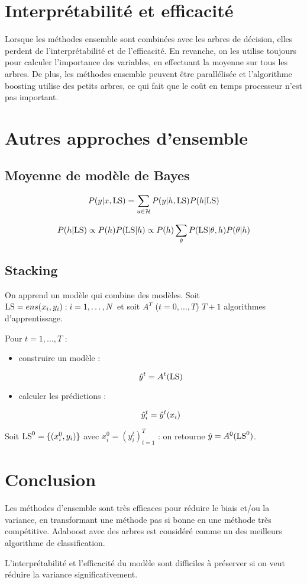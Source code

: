 \section{Interprétabilité et efficacité}
	
Lorsque les méthodes ensemble sont combinées avec les arbres de décision, elles perdent de l'interprétabilité et de l'efficacité. En revanche, on les utilise toujours pour calculer l'importance des variables, en effectuant la moyenne sur tous les arbres. De plus, les méthodes ensemble peuvent être parallélisée et l'algorithme boosting utilise des petits arbres, ce qui fait que le coût en temps processeur n'est pas important.
		
	
\section{Autres approches d'ensemble}

	\subsection{Moyenne de modèle de Bayes}
	$$P(y \vert x, \text{LS}) = \sum_{u \in \mathcal{H}} P(y \vert h, \text{LS}) P(h \vert \text{LS})$$
	
	$$P(h \vert \text{LS}) \propto P(h) P(\text{LS} \vert h) \propto P(h) \sum_\theta P(\text{LS} \vert \theta, h) P(\theta \vert h)$$
	
	\subsection{Stacking}
	
	On apprend un modèle qui combine des modèles. Soit $\text{LS} = ens{(x_i, y_i) : i = 1, \dots , N}$ et soit $A^T$ ($t = 0, \dots , T$) $T + 1$ algorithmes d'apprentissage.
	
	Pour $t = 1, \dots , T$ :
	
	\begin{itemize}
		\item construire un modèle :
		
		$$\hat{y}^t = A^t(\text{LS})$$
		
		\item calculer les prédictions :
		
		$$\hat{y}_i^t = \hat{y}^t (x_i)$$
	\end{itemize}
	
	Soit $\text{LS}^0 = \lbrace (x_i^0, y_i) \rbrace$ avec $x_i^0 = (y_i^t)^T_{t = 1}$ : on retourne $\hat{y} = A^0(\text{LS}^0)$.
	
\section{Conclusion}

Les méthodes d'ensemble sont très efficaces pour réduire le biais et/ou la variance, en transformant une méthode pas si bonne en une méthode très compétitive. Adaboost avec des arbres est considéré comme un des meilleurs algorithme de classification.

L'interprétabilité et l'efficacité du modèle sont difficiles à préserver si on veut réduire la variance significativement.